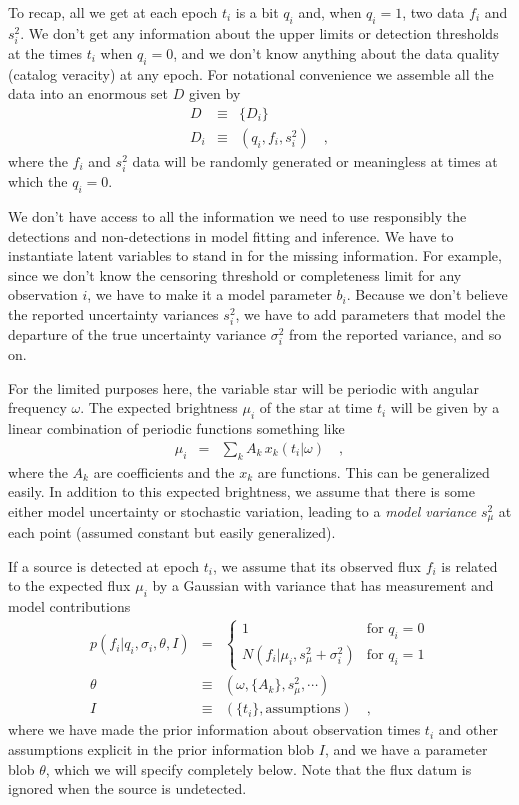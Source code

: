\documentclass[12pt,preprint]{aastex}
\begin{document}
To recap, all we get at each epoch $t_i$ is a bit $q_i$ and, when
$q_i=1$, two data $f_i$ and $s_i^2$.  We don't get any information
about the upper limits or detection thresholds at the times $t_i$ when
$q_i=0$, and we don't know anything about the data quality (catalog
veracity) at any epoch.  For notational convenience we assemble all
the data into an enormous set $D$ given by
\begin{eqnarray}\displaystyle
D &\equiv& \{D_i\}
\\
D_i &\equiv& (q_i, f_i, s_i^2)
\quad ,
\end{eqnarray}
where the $f_i$ and $s_i^2$ data will be randomly generated or
meaningless at times at which the $q_i=0$.

We don't have access to all the information we need to use responsibly
the detections and non-detections in model fitting and inference.  We
have to instantiate latent variables to stand in for the missing
information.  For example, since we don't know the censoring threshold
or completeness limit for any observation $i$, we have to make it a
model parameter $b_i$.  Because we don't believe the reported
uncertainty variances $s_i^2$, we have to add parameters that model
the departure of the true uncertainty variance $\sigma_i^2$ from the
reported variance, and so on.

For the limited purposes here, the variable star will be periodic with
angular frequency $\omega$.  The expected brightness $\mu_i$ of the
star at time $t_i$ will be given by a linear combination of periodic
functions something like
\begin{eqnarray}\displaystyle
\mu_i &=& \sum_k A_k\,x_k(t_i|\omega)
\quad ,
\end{eqnarray}
where the $A_k$ are coefficients and the $x_k$ are functions.  This
can be generalized easily.  In addition to this expected brightness,
we assume that there is some either model uncertainty or stochastic
variation, leading to a \emph{model variance} $s_\mu^2$ at each point
(assumed constant but easily generalized).

If a source is detected at epoch $t_i$, we assume that its observed
flux $f_i$ is related to the expected flux $\mu_i$ by a Gaussian with
variance that has measurement and model contributions
\begin{eqnarray}\displaystyle
p(f_i|q_i,\sigma_i,\theta,I) &=& \left\{\begin{array}{ll}
  1 & \mbox{for $q_i=0$} \\
  N(f_i|\mu_i,s_\mu^2+\sigma_i^2) & \mbox{for $q_i=1$}
\end{array}\right.\label{eq:poff}
\\
\theta &\equiv& (\omega, \{A_k\}, s_\mu^2, \cdots)
\\
I &\equiv& (\{t_i\}, \mbox{assumptions})
\quad ,
\end{eqnarray}
where we have made the prior information about observation times $t_i$
and other assumptions explicit in the prior information blob $I$, and
we have a parameter blob $\theta$, which we will specify completely
below.  Note that the flux datum is ignored when the source is
undetected.
\end{document}
